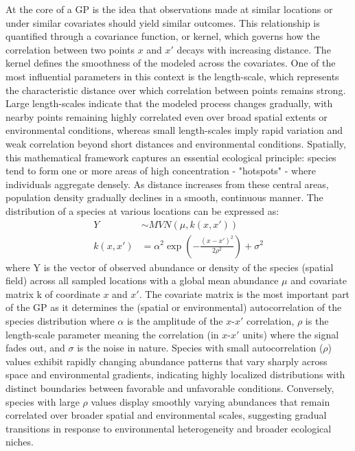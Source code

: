 \documentclass{article}
\begin{document}
At the core of a GP is the idea that observations made at similar locations or under similar covariates should yield similar outcomes. This relationship is quantified through a covariance function, or kernel, which governs how the correlation between two points $x$ and $x\prime$ decays with increasing distance. The kernel defines the smoothness of the modeled across the covariates. One of the most influential parameters in this context is the length-scale, which represents the characteristic distance over which correlation between points remains strong. Large length-scales indicate that the modeled process changes gradually, with nearby points remaining highly correlated even over broad spatial extents or environmental conditions, whereas small length-scales imply rapid variation and weak correlation beyond short distances and environmental conditions. Spatially, this mathematical framework captures an essential ecological principle: species tend to form one or more areas of high concentration - "hotspots" - where individuals aggregate densely. As distance increases from these central areas, population density gradually declines in a smooth, continuous manner. The distribution of a species at various locations can be expressed as:
\begin{align}
Y &\sim MVN (\mu,k(x,x\prime))\\
k(x, x\prime) &= \alpha^2 \exp\left(-\frac{(x - x\prime)^2}{2\rho^2}\right) + \sigma^2
\end{align}
where Y is the vector of observed abundance or density of the species (spatial field) across all sampled locations with a global mean abundance $\mu$ and covariate matrix k of coordinate $x$ and $x\prime$. The covariate matrix is the most important part of the GP as it determines the (spatial or environmental) autocorrelation of the species distribution where $\alpha$ is the amplitude of the $x$-$x\prime$ correlation, $\rho$ is the length-scale parameter meaning the correlation (in $x$-$x\prime$ units) where the signal fades out, and $\sigma$ is the noise in nature. Species with small autocorrelation ($\rho$) values exhibit rapidly changing abundance patterns that vary sharply across space and environmental gradients, indicating highly localized distributions with distinct boundaries between favorable and unfavorable conditions. Conversely, species with large $\rho$ values display smoothly varying abundances that remain correlated over broader spatial and environmental scales, suggesting gradual transitions in response to environmental heterogeneity and broader ecological niches.
\end{document}
